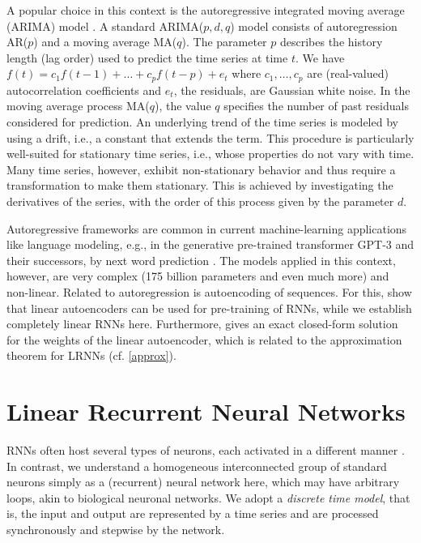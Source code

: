 \documentclass[preprint,12pt,times,authoryear]{elsarticle}%
\theoremstyle{definition}
\begin{document}
A popular choice in this context is the autoregressive integrated moving average
(ARIMA) model \citep{HK08,HA13}. A standard ARIMA($p,d,q$) model consists of
autoregression AR($p$) and a moving average MA($q$). The parameter $p$ describes
the history length (lag order) used to predict the time series at time $t$. We
have $f(t) = c_1 f(t-1) + \dots + c_p f(t-p) + e_t$ where $c_1,\dots,c_p$ are
(real-valued) autocorrelation coefficients and $e_t$, the residuals, are
Gaussian white noise. In the moving average process MA($q$), the value $q$
specifies the number of past residuals considered for prediction. An underlying
trend of the time series is modeled by using a drift, i.e., a constant that extends
the term. This procedure is particularly well-suited for stationary time series,
i.e., whose properties do not vary with time.
Many time series, however, exhibit non-stationary behavior and thus require a
transformation to make them stationary. This is achieved by investigating the
derivatives of the series, with the order of this process given by the parameter
$d$.

Autoregressive frameworks are common in current machine-learning applications
like language modeling, e.g., in the generative pre-trained transformer GPT-3 and their successors,
by next word prediction \citep{BM+20}. The models applied in this context,
however, are very complex (175 billion parameters and even much more) and non-linear.
Related to autoregression is autoencoding of sequences. For this, \citet{PS14}
show that linear autoencoders can be used for pre-training of RNNs, while we
establish completely linear RNNs here. Furthermore, \citet{Spe06} gives an
exact closed-form solution for the weights of the linear autoencoder, which is
related to the approximation theorem for LRNNs (cf. \cref{approx}).

\section{Linear Recurrent Neural Networks}\label{define}

RNNs often host several types of neurons, each activated in a different manner
\citep{Elm90,HS97}. In contrast, we understand a homogeneous
interconnected group of standard neurons simply as a (recurrent) neural network here, which may have
arbitrary loops, akin to biological neuronal networks. We adopt a \emph{discrete
time model}, that is, the input and output are represented by a time series and are
processed synchronously and stepwise by the network.
\end{document}
